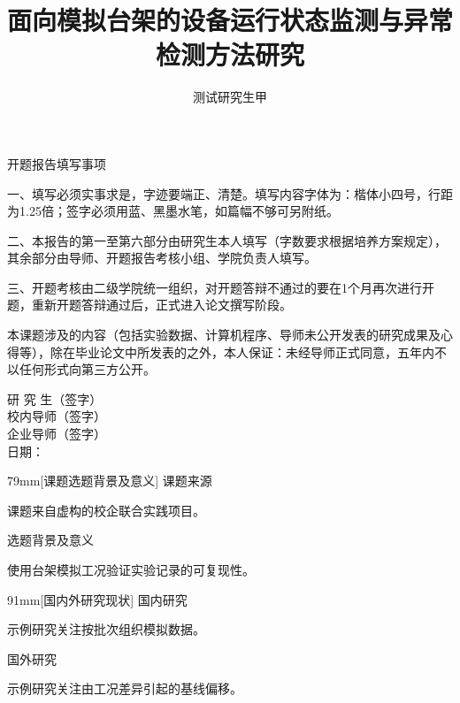 \documentclass{sdjumproposal}
\author{测试研究生甲}
\title{面向模拟台架的设备运行状态监测与异常检测方法研究}
\begin{document}
\makecover

\vspace*{28mm}
{\centering\kaishu{}开题报告填写事项\par}
\bigskip
\begingroup\kaishu{}
一、填写必须实事求是，字迹要端正、清楚。填写内容字体为：楷体小四号，行距为1.25倍；签字必须用蓝、黑墨水笔，如篇幅不够可另附纸。

二、本报告的第一至第六部分由研究生本人填写（字数要求根据培养方案规定），其余部分由导师、开题报告考核小组、学院负责人填写。

三、开题考核由二级学院统一组织，对开题答辩不通过的要在1个月再次进行开题，重新开题答辩通过后，正式进入论文撰写阶段。
\par\endgroup

\clearpage
\vspace*{26mm}
\begingroup\kaishu{}
本课题涉及的内容（包括实验数据、计算机程序、导师未公开发表的研究成果及心得等），除在毕业论文中所发表的之外，本人保证：未经导师正式同意，五年内不以任何形式向第三方公开。
\par
\begin{center}
研 究 生（签字）\\
校内导师（签字）\\
企业导师（签字）\\
日期：
\end{center}
\endgroup

\clearpage
{}
\pagestyle{proposalbody}
\kaishu
{}
\begin{formbox}{79mm}[课题选题背景及意义]
 课题来源\par
课题来自虚构的校企联合实践项目。\par\vspace{23mm}
 选题背景及意义\par
使用台架模拟工况验证实验记录的可复现性。
\end{formbox}

\begin{formbox}{91mm}[国内外研究现状]
 国内研究\par
示例研究关注按批次组织模拟数据\supercite{local-cn}。\par\vspace{25mm}
 国外研究\par
示例研究关注由工况差异引起的基线偏移\supercite{local-en}。
\end{formbox}
\end{document}
